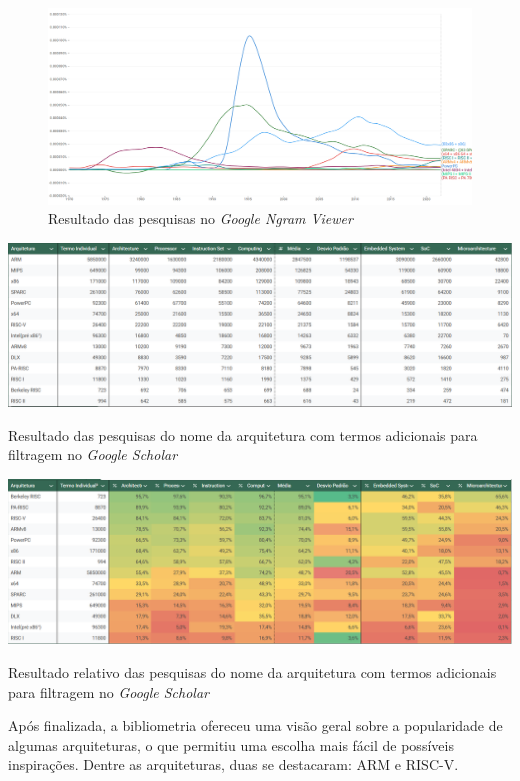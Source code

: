 \documentclass[
	12pt,				%
	openright,			%
	oneside,			%
	a4paper,			%
	english,			%
	french,				%
	spanish,			%
	brazil,				%
	]{abntex2}
\begin{document}
\begin{figure}[t]
    \centering
    \includegraphics[width=0.86\linewidth]{Webibliometria/full.png}
    \caption{Resultado das pesquisas no \textit{Google Ngram Viewer} \cite{valadares_uma_2025}}
    \label{fig:ngram}
\end{figure}
\begin{table}[t]
    \centering
    \includegraphics[width=0.86\linewidth]{Webibliometria/scholar.png}
    \caption{Resultado das pesquisas do nome da arquitetura com termos adicionais para filtragem no \textit{Google Scholar}\cite{valadares_uma_2025}}
    \label{fig:scholar}
\end{table}
\begin{table}[t]
    \centering
    \includegraphics[width=0.86\linewidth]{Webibliometria/scholarProx.png}
    \caption{Resultado relativo das pesquisas do nome da arquitetura com termos adicionais para filtragem no \textit{Google Scholar}\cite{valadares_uma_2025}}
    \label{fig:scholarProx}
\end{table}

Após finalizada, a bibliometria ofereceu uma visão geral sobre a popularidade de algumas arquiteturas, o que permitiu uma escolha mais fácil de possíveis inspirações. Dentre as arquiteturas, duas se destacaram: ARM e RISC-V.
\end{document}

